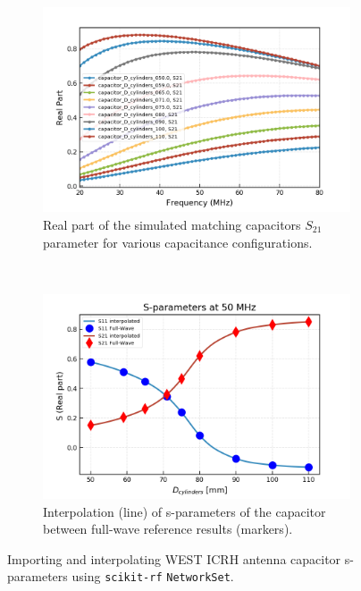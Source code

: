 \documentclass{aip-cp}
\begin{document}
	\begin{figure}[t!]
		\centering
		\begin{subfigure}[t]{0.49\textwidth}
			\centering
			\includegraphics[width=.95\textwidth]{figures/capas_set_S21db}
			\caption{Real part of the simulated matching capacitors $S_{21}$ parameter for various capacitance configurations.}
		\end{subfigure}%
		~
		\begin{subfigure}[t]{0.49\textwidth}
			\centering
			\includegraphics[width=\linewidth]{figures/S11_S21_interpolated}
			\caption{Interpolation (line) of s-parameters of the capacitor between full-wave reference results (markers).}
		\end{subfigure}
		\caption{Importing and interpolating WEST ICRH antenna capacitor s-parameters using \texttt{scikit-rf} \texttt{NetworkSet}.}
		\label{fig:fig1}
	\end{figure}
	
\end{document}
